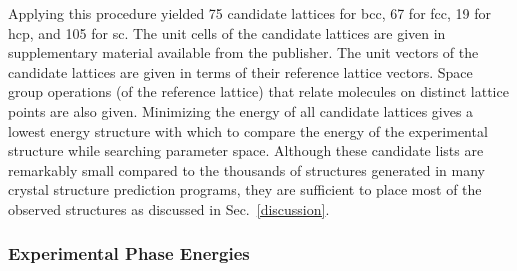 \documentclass[preprint]{iucr}              %
\begin{document}
Applying this procedure yielded 75 candidate lattices for bcc, 67 for fcc, 19
for hcp, and 105 for sc. The unit cells of the
candidate lattices are given in supplementary material available from the publisher. The unit
vectors of the candidate lattices are given in terms of their reference lattice vectors. Space
group operations (of the reference lattice) that relate molecules on
distinct lattice points are also given. Minimizing the energy of all
candidate lattices gives a lowest energy structure with which to
compare the energy of the experimental structure while searching
parameter space.  Although these candidate lists are remarkably small compared to the thousands of structures generated in many crystal structure prediction programs, they are sufficient to place most of the observed structures as discussed in Sec.~\ref{discussion}.


\subsubsection{Experimental Phase Energies}
\end{document}
